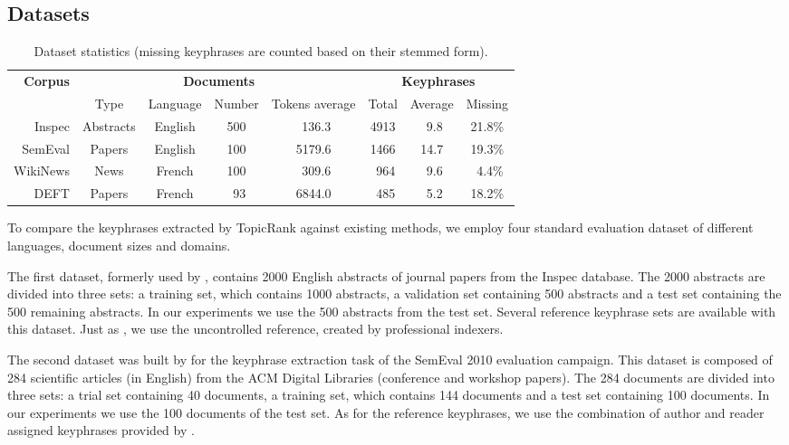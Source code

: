   \subsection{Datasets}
  \label{subsec:datasets}
    \begin{table}
      \centering
      \begin{tabular}{@{ }rccccccc@{ }}
        \toprule
        \multirow{2}{*}[-2pt]{\textbf{Corpus}} & \multicolumn{4}{c}{\textbf{Documents}} & \multicolumn{3}{c}{\textbf{Keyphrases}}\\
        \cmidrule(lr){2-5}\cmidrule(l){6-8}
        & Type & Language & Number & Tokens average & Total & Average & Missing\\
        \midrule
        Inspec & Abstracts & English & 500 & $~~$136.3 & 4913 & $~~$9.8 & 21.8\%\\
        SemEval & Papers & English & 100 & 5179.6 & 1466 & 14.7 & 19.3\%\\
        WikiNews & News & French & 100 & $~~$309.6 & $~~$964 & $~~$9.6 & $~~$4.4\%\\
        DEFT & Papers & French & $~~$93 & 6844.0 & $~~$485 & $~~$5.2 & 18.2\%\\
        \bottomrule
      \end{tabular}
      \caption{Dataset statistics (missing keyphrases are counted based on
               their stemmed form). \label{tab:corpora}}
    \end{table}

    To compare the keyphrases extracted by TopicRank against existing methods,
    we employ four standard evaluation dataset of different languages, document
    sizes and domains.
    
    The first dataset, formerly used by ,
    contains 2000 English abstracts of journal papers from the Inspec database.
    The 2000 abstracts are divided into three sets: a training set, which
    contains 1000 abstracts, a validation set containing 500 abstracts and a
    test set containing the 500 remaining abstracts. In our experiments we use
    the 500 abstracts from the test set. Several reference keyphrase sets are
    available with this dataset. Just as ,
    we use the uncontrolled reference, created by professional indexers.

    The second dataset was built by  for the keyphrase
    extraction task of the SemEval 2010 evaluation campaign. This dataset is
    composed of 284 scientific articles (in English) from the ACM Digital
    Libraries (conference and workshop papers). The 284 documents are
    divided into three sets: a trial set containing 40 documents, a training
    set, which contains 144 documents and a test set containing 100 documents.
    In our experiments we use the 100 documents of the test set. As for the
    reference keyphrases, we use the combination of author and reader assigned
    keyphrases provided by .

